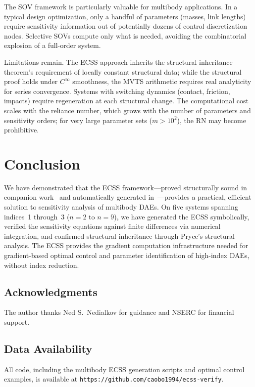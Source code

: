 \documentclass[12pt,a4paper]{article}
\theoremstyle{definition}
\theoremstyle{plain}
\begin{document}
The SOV framework is particularly valuable for multibody applications. In a typical design optimization, only a handful of parameters (masses, link lengths) require sensitivity information out of potentially dozens of control discretization nodes. Selective SOVs compute only what is needed, avoiding the combinatorial explosion of a full-order system.

Limitations remain. The ECSS approach inherits the structural inheritance theorem's requirement of locally constant structural data; while the structural proof holds under $C^\infty$ smoothness, the MVTS arithmetic requires real analyticity for series convergence. Systems with switching dynamics (contact, friction, impacts) require regeneration at each structural change. The computational cost scales with the reliance number, which grows with the number of parameters and sensitivity orders; for very large parameter sets ($m > 10^2$), the RN may become prohibitive.

\section{Conclusion}

We have demonstrated that the ECSS framework---proved structurally sound in companion work~\cite{cao2026structural} and automatically generated in~\cite{cao2026builder}---provides a practical, efficient solution to sensitivity analysis of multibody DAEs. On five systems spanning indices~1 through~3 ($n=2$ to $n=9$), we have generated the ECSS symbolically, verified the sensitivity equations against finite differences via numerical integration, and confirmed structural inheritance through Pryce's structural analysis. The ECSS provides the gradient computation infrastructure needed for gradient-based optimal control and parameter identification of high-index DAEs, without index reduction.

\subsection*{Acknowledgments}
The author thanks Ned S.\ Nedialkov for guidance and NSERC for financial support.

\subsection*{Data Availability}
All code, including the multibody ECSS generation scripts and optimal control examples, is available at \texttt{https://github.com/caobo1994/ecss-verify}.
\end{document}
